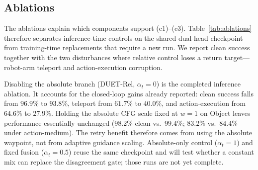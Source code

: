\documentclass[letterpaper, 10 pt, conference]{ieeeconf}
\begin{document}
\begin{table}[t]
\caption{Closed-loop success (\%) under external-force contact disturbances (fixed-step, $100\%$ injection, $N{=}500$ per cell).}
    \label{tab:force}
    \centering
    \end{table}


\subsection{Ablations}
The ablations explain which components support (c1)--(c3). Table~\ref{tab:ablations} therefore separates inference-time controls on the shared dual-head checkpoint from training-time replacements that require a new run. We report clean success together with the two disturbances where relative control loses a return target---robot-arm teleport and action-execution corruption.

Disabling the absolute branch (DUET-Rel, $\alpha_t=0$) is the completed inference ablation. It accounts for the closed-loop gains already reported: clean success falls from $96.9\%$ to $93.8\%$, teleport from $61.7\%$ to $40.0\%$, and action-execution from $64.6\%$ to $27.9\%$. Holding the absolute CFG scale fixed at $w{=}1$ on Object leaves performance essentially unchanged ($98.2\%$ clean vs.\ $99.4\%$; $83.2\%$ vs.\ $84.4\%$ under action-medium). The retry benefit therefore comes from using the absolute waypoint, not from adaptive guidance scaling. Absolute-only control ($\alpha_t=1$) and fixed fusion ($\alpha_t=0.5$) reuse the same checkpoint and will test whether a constant mix can replace the disagreement gate; those runs are not yet complete.
\end{document}
